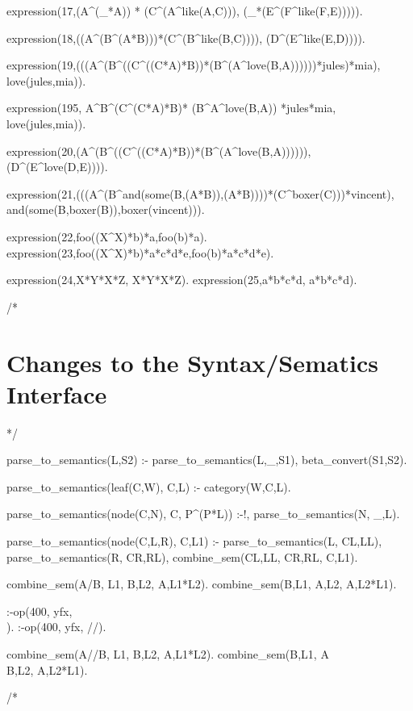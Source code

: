 \documentclass{book}[9pt]
\newenvironment{code}%
{\small \verbatim}%
{\endverbatim \large}
\begin{document}
\begin{code}
expression(17,(A^(_*A)) * (C^(A^like(A,C))),
           (_*(E^(F^like(F,E))))).

expression(18,((A^(B^(A*B)))*(C^(B^like(B,C)))),
           (D^(E^like(E,D)))).

expression(19,(((A^(B^((C^((C*A)*B))*(B^(A^love(B,A))))))*jules)*mia),
           love(jules,mia)).

expression(195, A^B^(C^(C*A)*B)* (B^A^love(B,A)) *jules*mia,
           love(jules,mia)).

expression(20,(A^(B^((C^((C*A)*B))*(B^(A^love(B,A)))))),
           (D^(E^love(D,E)))).

expression(21,(((A^(B^and(some(B,(A*B)),(A*B))))*(C^boxer(C)))*vincent),
           and(some(B,boxer(B)),boxer(vincent))).

expression(22,foo((X^X)*b)*a,foo(b)*a).
expression(23,foo((X^X)*b)*a*c*d*e,foo(b)*a*c*d*e).

expression(24,X*Y*X*Z, X*Y*X*Z).
expression(25,a*b*c*d, a*b*c*d).

/*
\end{code}

\section{Changes to the Syntax/Sematics Interface}

\begin{code}
*/

parse_to_semantics(L,S2) :-
        parse_to_semantics(L,_,S1),
        beta_convert(S1,S2).

parse_to_semantics(leaf(C,W), C,L) :-
        category(W,C,L).
        

parse_to_semantics(node(C,N), C, P^(P*L)) :-!,
        parse_to_semantics(N, _,L).
        

parse_to_semantics(node(C,L,R), C,L1) :-
        parse_to_semantics(L, CL,LL),
        parse_to_semantics(R, CR,RL),
        combine_sem(CL,LL, CR,RL, C,L1).

combine_sem(A/B, L1, B,L2,  A,L1*L2).
combine_sem(B,L1,  A\B,L2,  A,L2*L1).

:-op(400, yfx, \\).
:-op(400, yfx, //).


combine_sem(A//B, L1, B,L2,  A,L1*L2).
combine_sem(B,L1,  A\\B,L2,  A,L2*L1).

/*
\end{code}
\end{document}

